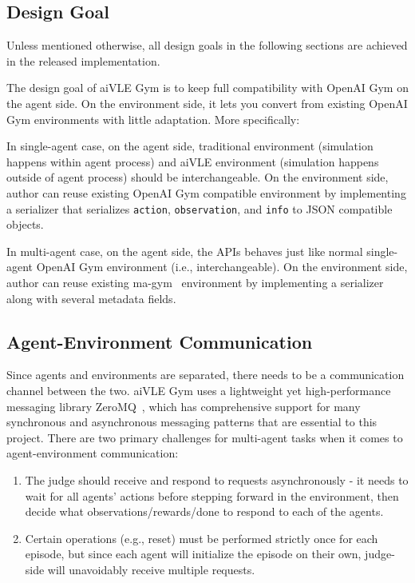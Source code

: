 \subsection{Design Goal}
Unless mentioned otherwise, all design goals in the following sections are achieved in the released implementation. 

The design goal of aiVLE Gym is to keep full compatibility with OpenAI Gym on the agent side. On the environment side, it lets you convert from existing OpenAI Gym environments with little adaptation. More specifically:

In single-agent case, on the agent side, traditional environment (simulation happens within agent process) and aiVLE environment (simulation happens outside of agent process) should be interchangeable. On the environment side, author can reuse existing OpenAI Gym compatible environment by implementing a serializer that serializes \texttt{action}, \texttt{observation}, and \texttt{info} to JSON compatible objects.

In multi-agent case, on the agent side, the APIs behaves just like normal single-agent OpenAI Gym environment (i.e., interchangeable). On the environment side, author can reuse existing ma-gym~\cite{magym} environment by implementing a serializer along with several metadata fields. 

\subsection{Agent-Environment Communication}
Since agents and environments are separated, there needs to be a communication channel between the two. aiVLE Gym uses a lightweight yet high-performance messaging library ZeroMQ~\cite{zeromq}, which has comprehensive support for many synchronous and asynchronous messaging patterns that are essential to this project. There are two primary challenges for multi-agent tasks when it comes to agent-environment communication:
\begin{enumerate}
    \item The judge should receive and respond to requests asynchronously - it needs to wait for all agents' actions before stepping forward in the environment, then decide what observations/rewards/done to respond to each of the agents.
    \item Certain operations (e.g., reset) must be performed strictly once for each episode, but since each agent will initialize the episode on their own, judge-side will unavoidably receive multiple requests.
\end{enumerate}

